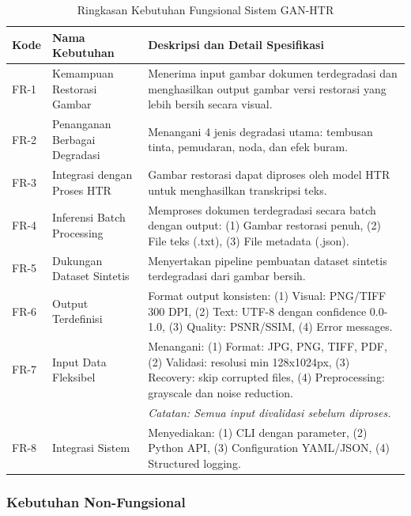 \documentclass[12pt,a4paper]{article}
\begin{document}
\begin{table}[htbp!]
\centering
\small
\caption{Ringkasan Kebutuhan Fungsional Sistem GAN-HTR}
\label{tab:functional_requirements}
\begin{tabular}{p{}p{}p{}}
\toprule
\textbf{Kode} & \textbf{Nama Kebutuhan} & \textbf{Deskripsi dan Detail Spesifikasi} \\
\midrule
FR-1 & Kemampuan Restorasi Gambar & Menerima input gambar dokumen terdegradasi dan menghasilkan output gambar versi restorasi yang lebih bersih secara visual. \\
\midrule
FR-2 & Penanganan Berbagai Degradasi & Menangani 4 jenis degradasi utama: tembusan tinta, pemudaran, noda, dan efek buram. \\
\midrule
FR-3 & Integrasi dengan Proses HTR & Gambar restorasi dapat diproses oleh model HTR untuk menghasilkan transkripsi teks. \\
\midrule
FR-4 & Inferensi Batch \newline Processing & Memproses dokumen terdegradasi secara batch dengan output: (1) Gambar restorasi penuh, (2) File teks (.txt), (3) File metadata (.json). \\
\midrule
FR-5 & Dukungan Dataset Sintetis & Menyertakan pipeline pembuatan dataset sintetis terdegradasi dari gambar bersih. \\
\midrule
FR-6 & Output Terdefinisi & Format output konsisten: (1) Visual: PNG/TIFF 300 DPI, (2) Text: UTF-8 dengan confidence 0.0-1.0, (3) Quality: PSNR/SSIM, (4) Error messages. \\
\midrule
FR-7 & Input Data Fleksibel & Menangani: (1) Format: JPG, PNG, TIFF, PDF, (2) Validasi: resolusi min 128x1024px, (3) Recovery: skip corrupted files, (4) Preprocessing: grayscale dan noise reduction. \\[-0.5em]
   & & \textit{Catatan: Semua input divalidasi sebelum diproses.} \\
\midrule
FR-8 & Integrasi Sistem & Menyediakan: (1) CLI dengan parameter, (2) Python API, (3) Configuration YAML/JSON, (4) Structured logging. \\
\bottomrule
\end{tabular}
\end{table}

\vspace{1.5em}

\clearpage
\subsubsection{Kebutuhan Non-Fungsional} %
\end{document}
